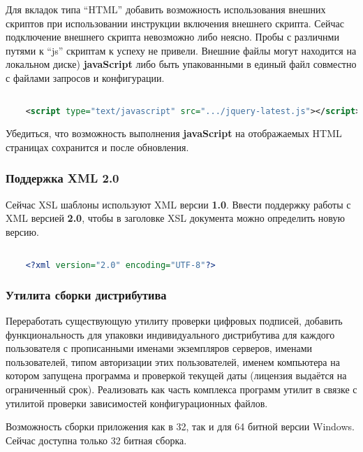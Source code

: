 Для вкладок типа ``HTML'' добавить возможность использования внешних скриптов при использовании
инструкции включения внешнего скрипта. Сейчас подключение внешнего скрипта невозможно либо неясно.
Пробы с различнми путями к ``js'' скриптам к успеху не привели. Внешние файлы могут находится на
локальном диске) \textbf{javaScript} либо быть упакованными в единый файл совместно с
файлами запросов и конфигурации.

\begin{lstlisting}[language=XML,label=javascript,caption=javascript]

	<script type="text/javascript" src=".../jquery-latest.js"></script>

\end{lstlisting}

Убедиться, что возможность выполнения \textbf{javaScript} на отображаемых HTML страницах сохранится
и после обновления.

\subsubsection{Поддержка XML 2.0}

Сейчас XSL шаблоны используют XML версии \textbf{1.0}. Ввести поддержку работы с XML версией
\textbf{2.0}, чтобы в заголовке XSL документа можно определить новую версию.

\begin{lstlisting}[language=XML,label=MSSQLServerAuditor.xml,caption=MSSQLServerAuditor.xml]

	<?xml version="2.0" encoding="UTF-8"?>

\end{lstlisting}

\subsubsection{Утилита сборки дистрибутива}

Переработать существующую утилиту проверки цифровых подписей, добавить функциональность для упаковки
индивидуального дистрибутива для каждого пользователя с прописанными именами экземпляров серверов,
именами пользователей, типом авторизации этих пользователей, именем компьютера на котором запущена
программа и проверкой текущей даты (лицензия выдаётся на ограниченный срок). Реализовать как часть
комплекса программ утилит в связке с утилитой проверки зависимостей конфигурационных файлов.

\bigskip

Возможность сборки приложения как в 32, так и для 64 битной версии Windows. Сейчас доступна только
32 битная сборка.

